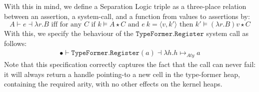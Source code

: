 \documentclass[a4paper, UKenglish, cleveref, autoref, thm-restate, colorlinks]{lipics-v2021}
\newcommand{\lam}[1]{\lambda{#1}.}
\begin{document}
With this in mind, we define a Separation Logic triple as a three-place relation between an assertion, a system-call, and a function from values to assertions by:
\begin{displaymath}
A \vdash e \dashv \lam{r}B \text{ iff for any } C \text{ if } k \vDash A \star C \text{ and } e\ k = \langle v, k' \rangle \text{ then } k' \vDash (\lam{r}B)v \star C
\end{displaymath}
With this, we specify the behaviour of the $\mathtt{TypeFormer.Register}$ system call as follows:
\begin{gather*}
\bullet \vdash \mathtt{TypeFormer.Register}(a) \dashv \lam{h}h \mapsto_{Aty} a
\end{gather*}
Note that this specification correctly captures the fact that the call can never fail: it will always return a handle pointing-to a new cell in the type-former heap, containing the required arity, with no other effects on the kernel heaps.
\end{document}
